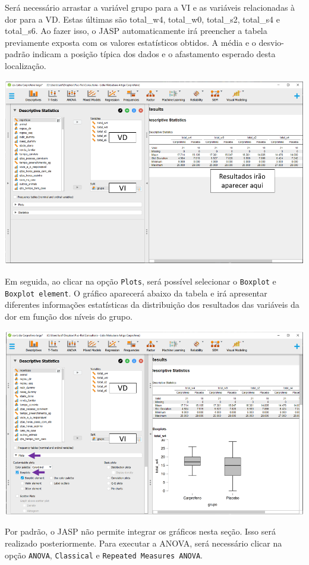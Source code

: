 \documentclass[
]{book}
\begin{document}
Será necessário arrastar a variável grupo para a VI e as variáveis relacionadas à dor para a VD. Estas últimas são total\_w4, total\_w0, total\_s2, total\_s4 e total\_s6. Ao fazer isso, o JASP automaticamente irá preencher a tabela previamente exposta com os valores estatísticos obtidos. A média e o desvio-padrão indicam a posição típica dos dados e o afastamento esperado desta localização.

\includegraphics{./img/cap_anovarm_descriptives3.png}

Em seguida, ao clicar na opção \texttt{Plots}, será possível selecionar o \texttt{Boxplot} e \texttt{Boxplot\ element}. O gráfico aparecerá abaixo da tabela e irá apresentar diferentes informações estatísticas da distribuição dos resultados das variáveis da dor em função dos níveis do grupo.

\includegraphics{./img/cap_anovarm_plots1.png}

Por padrão, o JASP não permite integrar os gráficos nesta seção. Isso será realizado posteriormente. Para executar a ANOVA, será necessário clicar na opção \texttt{ANOVA}, \texttt{Classical} e \texttt{Repeated\ Measures\ ANOVA}.
\end{document}
